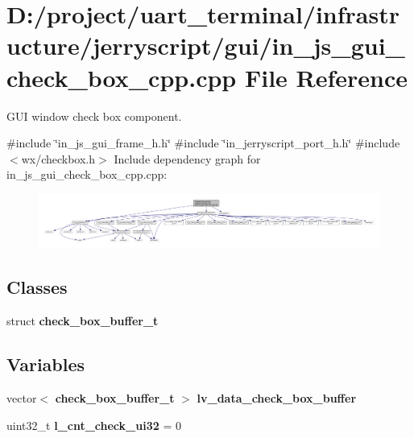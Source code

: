 \section{D\+:/project/uart\+\_\+terminal/infrastructure/jerryscript/gui/in\+\_\+js\+\_\+gui\+\_\+check\+\_\+box\+\_\+cpp.cpp File Reference}
\label{in__js__gui__check__box__cpp_8cpp}


G\+UI window check box component.  


{\ttfamily \#include \char`\"{}in\+\_\+js\+\_\+gui\+\_\+frame\+\_\+h.\+h\char`\"{}}\newline
{\ttfamily \#include \char`\"{}in\+\_\+jerryscript\+\_\+port\+\_\+h.\+h\char`\"{}}\newline
{\ttfamily \#include $<$wx/checkbox.\+h$>$}\newline
Include dependency graph for in\+\_\+js\+\_\+gui\+\_\+check\+\_\+box\+\_\+cpp.\+cpp\+:
\nopagebreak
\begin{figure}[H]
\begin{center}
\leavevmode
\includegraphics[width=350pt]{in__js__gui__check__box__cpp_8cpp__incl}
\end{center}
\end{figure}
\subsection*{Classes}
\begin{DoxyCompactItemize}
\item 
struct \textbf{ check\+\_\+box\+\_\+buffer\+\_\+t}
\end{DoxyCompactItemize}
\subsection*{Variables}
\begin{DoxyCompactItemize}
\item 
vector$<$ \textbf{ check\+\_\+box\+\_\+buffer\+\_\+t} $>$ \textbf{ lv\+\_\+data\+\_\+check\+\_\+box\+\_\+buffer}
\item 
uint32\+\_\+t {\bfseries l\+\_\+cnt\+\_\+check\+\_\+ui32} = 0
\end{DoxyCompactItemize}


